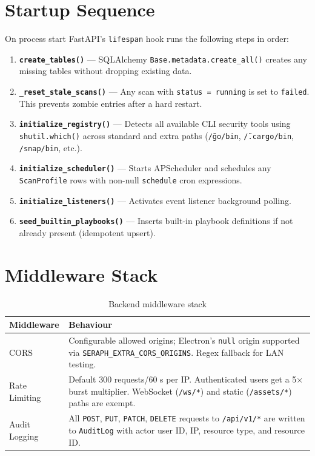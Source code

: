 \documentclass[11pt,a4paper,twoside,openright]{book}
\begin{document}
\section{Startup Sequence}

On process start FastAPI's \texttt{lifespan} hook runs the following steps in order:

\begin{enumerate}[leftmargin=*]
  \item \textbf{\texttt{create\_tables()}} --- SQLAlchemy \texttt{Base.metadata.create\_all()} creates any missing tables without dropping existing data.
  \item \textbf{\texttt{\_reset\_stale\_scans()}} --- Any scan with \texttt{status = running} is set to \texttt{failed}. This prevents zombie entries after a hard restart.
  \item \textbf{\texttt{initialize\_registry()}} --- Detects all available CLI security tools using \texttt{shutil.which()} across standard and extra paths (\texttt{\~/go/bin}, \texttt{\~/.cargo/bin}, \texttt{/snap/bin}, etc.).
  \item \textbf{\texttt{initialize\_scheduler()}} --- Starts APScheduler and schedules any \texttt{ScanProfile} rows with non-null \texttt{schedule} cron expressions.
  \item \textbf{\texttt{initialize\_listeners()}} --- Activates event listener background polling.
  \item \textbf{\texttt{seed\_builtin\_playbooks()}} --- Inserts built-in playbook definitions if not already present (idempotent upsert).
\end{enumerate}

\section{Middleware Stack}

\begin{table}[H]
\centering
\begin{tabularx}{\textwidth}{L{3.5cm} X}
\toprule
\textbf{Middleware} & \textbf{Behaviour} \\
\midrule
CORS & Configurable allowed origins; Electron's \texttt{null} origin supported via \texttt{SERAPH\_EXTRA\_CORS\_ORIGINS}. Regex fallback for LAN testing. \\
Rate Limiting & Default 300 requests/60 s per IP. Authenticated users get a 5× burst multiplier. WebSocket (\texttt{/ws/*}) and static (\texttt{/assets/*}) paths are exempt. \\
Audit Logging & All \texttt{POST}, \texttt{PUT}, \texttt{PATCH}, \texttt{DELETE} requests to \texttt{/api/v1/*} are written to \texttt{AuditLog} with actor user ID, IP, resource type, and resource ID. \\
\bottomrule
\end{tabularx}
\caption{Backend middleware stack}
\end{table}
\end{document}
